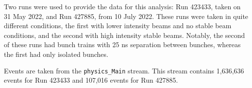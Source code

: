 
Two runs were used to provide the data for this analysis: Run 423433, taken on
31 May 2022, and Run 427885, from 10 July 2022. These runs were taken in quite
different conditions, the first with lower intensity beams and no stable
beam conditions, and the second with high intensity stable beams. Notably, the
second of these runs had bunch trains with 25 ns separation between bunches,
whereas the first had only isolated bunches.

Events are taken from the \verb|physics_Main| stream. This stream contains
1,636,636 events for Run 423433 and 107,016 events for Run 427885.

